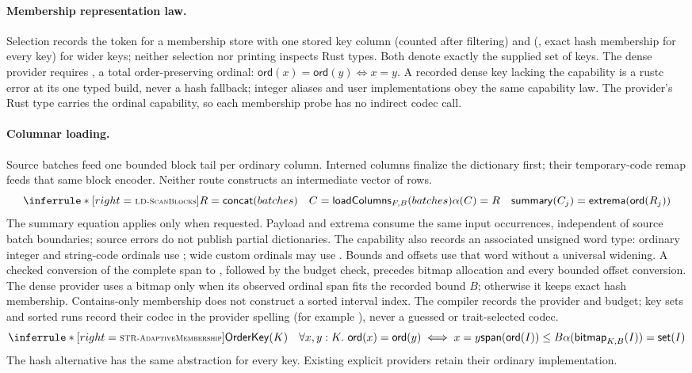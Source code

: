 \paragraph{Membership representation law.}
Selection records the  token
 for a membership store with one stored key column
(counted after filtering) and 
(, exact hash membership for every
 key) for wider keys; neither selection nor printing inspects
Rust types. Both denote exactly the supplied set of keys. The dense provider
requires , a total order-preserving ordinal:
$\mathsf{ord}(x)=\mathsf{ord}(y)\iff x=y$. A recorded dense key lacking the
capability is a rustc error at its one typed build, never a hash fallback;
integer aliases and user implementations obey the same capability law. The
provider's Rust type carries the ordinal capability, so each membership probe
has no indirect codec call.

\paragraph{Columnar loading.}
Source batches feed one bounded block tail per ordinary column. Interned
columns finalize the dictionary first; their temporary-code remap feeds that
same block encoder. Neither route constructs an intermediate vector of rows.
\[
\Rule{LD-ScanBlocks}{R=\mathsf{concat}(batches)\quad
 C=\mathsf{loadColumns}_{F,B}(batches)}
 {\alpha(C)=R\quad
  \mathsf{summary}(C_j)=\mathsf{extrema}(\mathsf{ord}(R_j))}
\]
The summary equation applies only when requested. Payload and extrema consume
the same input occurrences, independent of source batch boundaries; source
errors do not publish partial dictionaries.
The capability also records an associated unsigned word type: ordinary
integer and string-code ordinals use ; wide custom ordinals may use
. Bounds and offsets use that word without a universal widening.
A checked conversion of the complete span to , followed by the
budget check, precedes bitmap allocation and every bounded offset conversion.
The dense provider uses a bitmap only when its observed ordinal span fits the
recorded bound $B$; otherwise it keeps exact hash membership. Contains-only
membership does not construct a sorted interval index.
The compiler records the provider and budget; key sets and sorted runs record
their codec in the provider spelling (for example ), never a
guessed or trait-selected codec.
\[
\Rule{STR-AdaptiveMembership}{
 \mathsf{OrderKey}(K)\quad
 \forall x,y:K.\ \mathsf{ord}(x)=\mathsf{ord}(y)\iff x=y\\
 \mathsf{span}(\mathsf{ord}(I))\le B
}{
 \alpha(\mathsf{bitmap}_{K,B}(I))=\mathsf{set}(I)
}
\]
The hash alternative has the same abstraction for every  key.
Existing explicit providers retain their ordinary  implementation.

